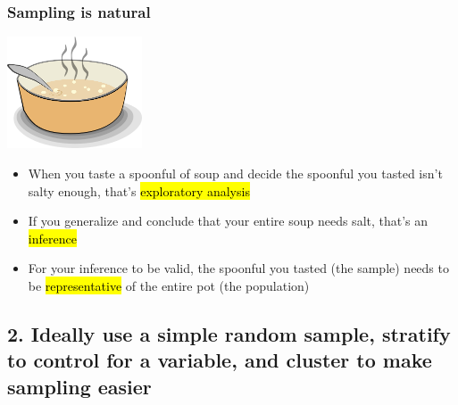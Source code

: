 \documentclass[slidestop,compress,mathserif,12pt,t,professionalfonts,xcolor=table]{beamer}
\begin{document}
\begin{frame}
\frametitle{Sampling is natural}

\begin{center}
\includegraphics[width=0.3\textwidth]{figures/soup}
\end{center}

\begin{itemize}

\item When you taste a spoonful of soup and decide the spoonful you tasted isn't salty enough, that's \hl{exploratory analysis}

\item If you generalize and conclude that your entire soup needs salt, that's an \hl{inference}

\item For your inference to be valid, the spoonful you tasted (the sample) needs to be \hl{representative} of the entire pot (the population)

\end{itemize}

\end{frame}


\subsection{2. Ideally use a simple random sample, stratify to control for a variable, and cluster to make sampling easier}

\end{document}

